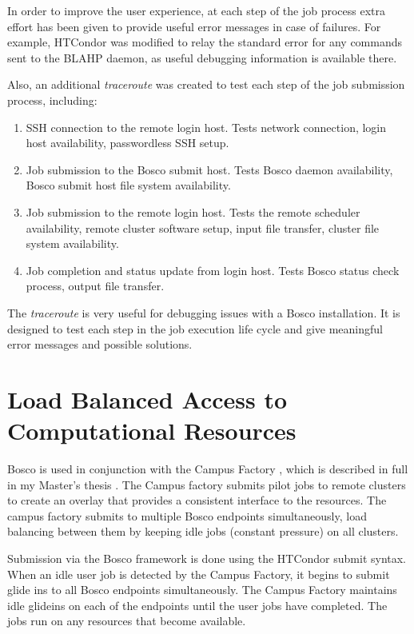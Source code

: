 In order to improve the user experience, at each step of the job process extra effort has been given to provide useful error messages in case of failures.  For example, HTCondor was modified to relay the standard error for any commands sent to the BLAHP daemon, as useful debugging information is available there.  

Also, an additional \emph{traceroute} was created to test each step of the job submission process, including:

\begin{enumerate}
\item SSH connection to the remote login host.  Tests network connection, login host availability, passwordless SSH setup.
\item Job submission to the Bosco submit host.  Tests Bosco daemon availability, Bosco submit host file system availability.
\item Job submission to the remote login host.  Tests the remote scheduler availability, remote cluster software setup, input file transfer, cluster file system availability.
\item Job completion and status update from login host.  Tests Bosco status check process, output file transfer.
\end{enumerate}

The \emph{traceroute} is very useful for debugging issues with a Bosco installation.  It is designed to test each step in the job execution life cycle and give meaningful error messages and possible solutions.

\section{Load Balanced Access to Computational Resources}

Bosco is used in conjunction with the Campus Factory \cite{website:campusfactory}, which is described in full in my Master's thesis \cite{weitzel2011campus}.  The Campus factory submits pilot jobs to remote clusters to create an overlay that provides a consistent interface to the resources.  The campus factory submits to multiple Bosco endpoints simultaneously, load balancing between them by keeping idle jobs (constant pressure) on all clusters.

Submission via the Bosco framework is done using the HTCondor submit syntax.  When an idle user job is detected by the Campus Factory, it begins to submit glide ins to all Bosco endpoints simultaneously.  The Campus Factory maintains idle glideins on each of the endpoints until the user jobs have completed.  The jobs run on any resources that become available.


